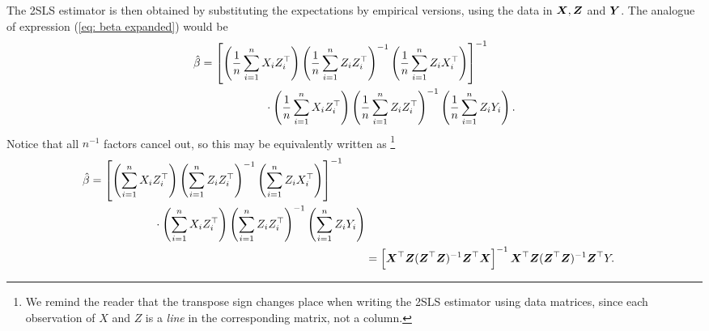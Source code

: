 The 2SLS estimator is then obtained by substituting the expectations by empirical versions, using the data in $ \boldsymbol X, \boldsymbol Z $ and $ \boldsymbol Y $.
The analogue of expression (\ref{eq: beta expanded}) would be
\begin{align}
    \label{eq: beta hat expanded}
    \begin{split}
        \hat{ \beta }
        &=
        \left[
            \left(
                \frac{ 1 }{ n } \sum_{ i=1 }^{ n } X_{ i } Z_{ i }^{ \top }
            \right)
            \left(
                \frac{ 1 }{ n } \sum_{ i=1 }^{ n } Z_{ i } Z_{ i }^{ \top }
            \right)^{ -1 }
            \left(
                \frac{ 1 }{ n } \sum_{ i=1 }^{ n } Z_{ i } X_{ i }^{ \top }
            \right)
        \right]^{ -1 } \\
        &\hspace{2cm} \cdot
        \left(
            \frac{ 1 }{ n } \sum_{ i=1 }^{ n } X_{ i } Z_{ i }^{ \top }
        \right)
        \left(
            \frac{ 1 }{ n } \sum_{ i=1 }^{ n } Z_{ i } Z_{ i }^{ \top }
        \right)^{ -1 }
        \left(
            \frac{ 1 }{ n } \sum_{ i=1 }^{ n } Z_{ i } Y_{ i }
        \right).
    \end{split}
\end{align}        
Notice that all $ n^{ -1 } $ factors cancel out, so this may be equivalently written as
\footnote{
We remind the reader that the transpose sign changes place when writing the 2SLS estimator using data matrices, since each observation of $ X $ and $ Z $ is a \emph{line} in the corresponding matrix, not a column.
}
\begin{align*}
    \begin{split}
        \hat{ \beta }
        &= 
        \left[
            \left(
                \sum_{ i=1 }^{ n } X_{ i } Z_{ i }^{ \top }
            \right)
            \left(
                \sum_{ i=1 }^{ n } Z_{ i } Z_{ i }^{ \top }
            \right)^{ -1 }
            \left(
                \sum_{ i=1 }^{ n } Z_{ i } X_{ i }^{ \top }
            \right)
        \right]^{ -1 } \\
        &\hspace{2cm} \cdot
        \left(
            \sum_{ i=1 }^{ n } X_{ i } Z_{ i }^{ \top }
        \right)
        \left(
            \sum_{ i=1 }^{ n } Z_{ i } Z_{ i }^{ \top }
        \right)^{ -1 }
        \left(
            \sum_{ i=1 }^{ n } Z_{ i } Y_{ i }
        \right)
    \end{split} \\
    &= \left[
        \boldsymbol X^{ \top } \boldsymbol Z ( \boldsymbol Z^{ \top } \boldsymbol Z )^{ -1 } \boldsymbol Z^{ \top } \boldsymbol X
    \right]^{ -1 }
    \boldsymbol X^{ \top } \boldsymbol Z ( \boldsymbol Z^{ \top } \boldsymbol Z )^{ -1 } \boldsymbol Z^{ \top } Y
.\end{align*}

